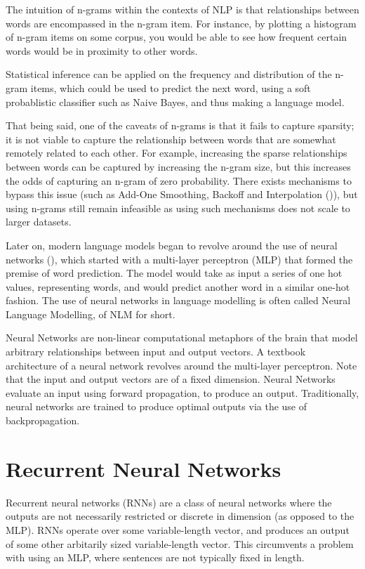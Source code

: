 \documentclass[12pt,twoside]{report}
\begin{document}
The intuition of n-grams within the contexts of NLP is that relationships between words are encompassed in the n-gram item. For instance, by plotting a histogram of n-gram items on some corpus, you would be able to see how frequent certain words would be in proximity to other words.

Statistical inference can be applied on the frequency and distribution of the n-gram items, which could be used to predict the next word, using a soft probablistic classifier such as Naive Bayes, and thus making a language model. 

That being said, one of the caveats of n-grams is that it fails to capture sparsity; it is not viable to capture the relationship between words that are somewhat remotely related to each other. For example, increasing the sparse relationships between words can be captured by increasing the n-gram size, but this increases the odds of capturing an n-gram of zero probability. There exists mechanisms to bypass this issue (such as Add-One Smoothing, Backoff and Interpolation (\cite{jurafsky_speech_2019})), but using n-grams still remain infeasible as using such mechanisms does not scale to larger datasets.

Later on, modern language models began to revolve around the use of neural networks (\cite{bengio_neural_2001}), which started with a multi-layer perceptron (MLP) that formed the premise of word prediction. The model would take as input a series of one hot values, representing words, and would predict another word in a similar one-hot fashion. The use of neural networks in language modelling is often called Neural Language Modelling, of NLM for short.

Neural Networks are non-linear computational metaphors of the brain that model arbitrary relationships between input and output vectors. A textbook architecture of a neural network revolves around the multi-layer perceptron. Note that the input and output vectors are of a fixed dimension. Neural Networks evaluate an input using forward propagation, to produce an output. Traditionally, neural networks are trained to produce optimal outputs via the use of backpropagation. 

\section{Recurrent Neural Networks}
\label{rnn}

Recurrent neural networks (RNNs) are a class of neural networks where the outputs are not necessarily restricted or discrete in dimension (as opposed to the MLP). RNNs operate over some variable-length vector, and produces an output of some other arbitarily sized variable-length vector. This circumvents a problem with using an MLP, where sentences are not typically fixed in length. 
\end{document}
